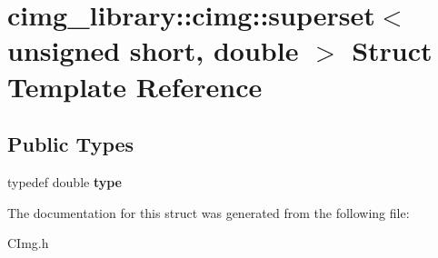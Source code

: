 \hypertarget{structcimg__library_1_1cimg_1_1superset_3_01unsigned_01short_00_01double_01_4}{\section{cimg\-\_\-library\-:\-:cimg\-:\-:superset$<$ unsigned short, double $>$ Struct Template Reference}
\label{structcimg__library_1_1cimg_1_1superset_3_01unsigned_01short_00_01double_01_4}
}
\subsection*{Public Types}
\begin{DoxyCompactItemize}
\item 
\hypertarget{structcimg__library_1_1cimg_1_1superset_3_01unsigned_01short_00_01double_01_4_a6be57cc82d0cb67ff4740fffb5a7ef32}{typedef double {\bfseries type}}\label{structcimg__library_1_1cimg_1_1superset_3_01unsigned_01short_00_01double_01_4_a6be57cc82d0cb67ff4740fffb5a7ef32}

\end{DoxyCompactItemize}


The documentation for this struct was generated from the following file\-:\begin{DoxyCompactItemize}
\item 
C\-Img.\-h\end{DoxyCompactItemize}
